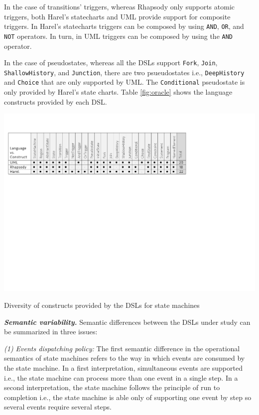 In the case of transitions' triggers, whereas Rhapsody only supports atomic triggers, both Harel's statecharts and UML provide support for composite triggers. In Harel's statecharts triggers can be composed by using \texttt{AND}, \texttt{OR}, and \texttt{NOT} operators. In turn, in UML triggers can be composed by using the \texttt{AND} operator.

In the case of pseudostates, whereas all the DSLs support \texttt{Fork}, \texttt{Join}, \texttt{ShallowHistory}, and \texttt{Junction}, there are two psueudostates i.e., \texttt{DeepHistory} and \texttt{Choice} that are only supported by UML. The \texttt{Conditional} pseudostate is only provided by Harel's state charts. Table \ref{fig:oracle} shows the language constructs provided by each DSL.

\begin{table}[t]
\centering
\includegraphics[width=1\linewidth]{images/tab-oracle-statemachines}
\caption{Diversity of constructs provided by the DSLs for state machines}
\label{fig:oracle}
\end{table}

\vspace{2mm}
\textit{\textbf{Semantic variability.}} Semantic differences between the DSLs under study can be summarized in three issues:

\vspace{2mm}
\textit{(1) Events dispatching policy:} The first semantic difference in the operational semantics of state machines refers to the way in which events are consumed by the state machine. In a first interpretation, simultaneous events are supported i.e., the state machine can process more than one event in a single step. In a second interpretation, the state machine follows the principle of run to completion i.e., the state machine is able only of supporting one event by step so several events require several steps.


